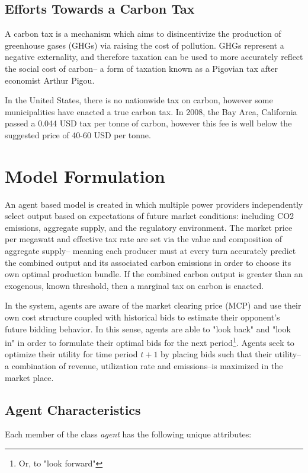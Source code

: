 \documentclass[12pt]{article}
\begin{document}
\subsection{Efforts Towards a Carbon Tax}
A carbon tax is a mechanism which aims to disincentivize the production of greenhouse gases (GHGs) via raising the cost of pollution. GHGs represent a negative externality, and therefore taxation can be used to more accurately reflect the social cost of carbon-- a form of taxation known as a Pigovian tax after economist Arthur Pigou\cite{pigou}. \*

In the United States, there is no nationwide tax on carbon, however some municipalities have enacted a true carbon tax. In 2008, the Bay Area, California passed a 0.044 USD tax per tonne of carbon, however this fee is well below the suggested price of 40-60 USD per tonne\cite{co2tax}. 


\section{Model Formulation}
An agent based model is created in which multiple power providers independently select output based on expectations of future market conditions: including CO2 emissions, aggregate supply, and the regulatory environment. The market price per megawatt and effective tax rate are set via the value and composition of aggregate supply-- meaning each producer must at every turn accurately predict the combined output and its associated carbon emissions in order to choose its own optimal production bundle. If the combined carbon output is greater than an exogenous, known threshold, then a marginal tax on carbon is enacted. \* 

In the system, agents are aware of the market clearing price (MCP) and use their own cost structure coupled with historical bids to estimate their opponent's future bidding behavior. In this sense, agents are able to "look back" and "look in" in order to formulate their optimal bids for the next period\footnote{Or, to "look forward"}. Agents seek to optimize their utility for time period $t+1$ by placing bids such that their utility-- a combination of revenue, utilization rate and emissions--is maximized in the market place. 

\subsection{Agent Characteristics}
Each member of the class \emph{agent} has the following unique attributes: 
\end{document}
